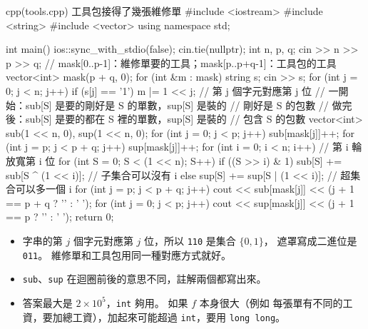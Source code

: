 \begin{example}[label=ex:bm-sos]{cpp}{(tools.cpp) 工具包接得了幾張維修單}
#include <iostream>
#include <string>
#include <vector>
using namespace std;

int main() {
    ios::sync_with_stdio(false);
    cin.tie(nullptr);
    int n, p, q;
    cin >> n >> p >> q;
    // mask[0..p-1]：維修單要的工具；mask[p..p+q-1]：工具包的工具
    vector<int> mask(p + q, 0);
    for (int &m : mask) {
        string s;
        cin >> s;
        for (int j = 0; j < n; j++) {
            if (s[j] == '1') {
                m |= 1 << j;              // 第 j 個字元對應第 j 位
            }
        }
    }
    // 一開始：sub[S] 是要的剛好是 S 的單數，sup[S] 是裝的
    //         剛好是 S 的包數
    // 做完後：sub[S] 是要的都在 S 裡的單數，sup[S] 是裝的
    //         包含 S 的包數
    vector<int> sub(1 << n, 0), sup(1 << n, 0);
    for (int j = 0; j < p; j++) {
        sub[mask[j]]++;
    }
    for (int j = p; j < p + q; j++) {
        sup[mask[j]]++;
    }
    for (int i = 0; i < n; i++) {         // 第 i 輪放寬第 i 位
        for (int S = 0; S < (1 << n); S++) {
            if ((S >> i) & 1) {
                sub[S] += sub[S ^ (1 << i)];    // 子集合可以沒有 i
            } else {
                sup[S] += sup[S | (1 << i)];    // 超集合可以多一個 i
            }
        }
    }
    for (int j = p; j < p + q; j++) {
        cout << sub[mask[j]] << (j + 1 == p + q ? '\n' : ' ');
    }
    for (int j = 0; j < p; j++) {
        cout << sup[mask[j]] << (j + 1 == p ? '\n' : ' ');
    }
    return 0;
}
\end{example}


\begin{itemize}
\item 字串的第 $j$ 個字元對應第 $j$ 位，所以 \texttt{110} 是集合 $\{0, 1\}$，
遮罩寫成二進位是 \texttt{011}。 維修單和工具包用同一種對應方式就好。
\item \texttt{sub}、\texttt{sup} 在迴圈前後的意思不同，註解兩個都寫出來。
\item 答案最大是 $2 \times 10^5$，\texttt{int} 夠用。 如果 $f$ 本身很大（例如
每張單有不同的工資，要加總工資），加起來可能超過 \texttt{int}，要用
\texttt{long long}。
\end{itemize}

